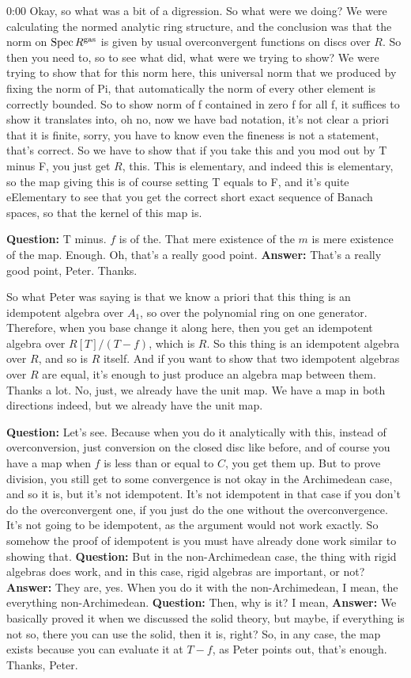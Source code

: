 \begin{unfinished}{0:00}
Okay, so what was a bit of a digression. So what were we doing? We were calculating the normed analytic ring structure, and the conclusion was that the norm on $\operatorname{Spec} R^{\mathrm{gas}}$ is given by usual overconvergent functions on discs over $R$. So then you need to, so to see what did, what were we trying to show? We were trying to show that for this norm here, this universal norm that we produced by fixing the norm of Pi, that automatically the norm of every other element is correctly bounded. So to show norm of f contained in zero f for all f, it suffices to show it translates into, 
oh no, now we have bad notation, it's not clear a priori that it is finite, sorry, you have to know even the fineness is not a statement, that's correct. So we have to show that if you take this and you mod out by T minus F, you just get $R$, this. This is elementary, and indeed this is elementary, so the map giving this is of course setting T equals to F, and it's quite eElementary to see that you get the correct short exact sequence of Banach spaces, so that the kernel of this map is.

\textbf{Question:} T minus. $f$ is of the. That mere existence of the $m$ is mere existence of the map. Enough. Oh, that's a really good point. 
\textbf{Answer:}  That's a really good point, Peter. Thanks.

So what Peter was saying is that we know a priori that this thing is an idempotent algebra over $A_1$, so over the polynomial ring on one generator. Therefore, when you base change it along here, then you get an idempotent algebra over $R[T]/(T-f)$, which is $R$. So this thing is an idempotent algebra over $R$, and so is $R$ itself.
And if you want to show that two idempotent algebras over $R$ are equal, it's enough to just produce an algebra map between them. Thanks a lot. No, just, we already have the unit map. We have a map in both directions indeed, but we already have the unit map.

\textbf{Question:} Let's see. Because when you do it analytically with this, instead of overconversion, just conversion on the closed disc like before, and of course you have a map when $f$ is less than or equal to $C$, you get them up. But to prove division, you still get to some convergence is not okay in the Archimedean case, and so it is, but it's not idempotent. It's not idempotent in that case if you don't do the overconvergent one, if you just do the one without the overconvergence. It's not going to be idempotent, as the argument would not work exactly. So somehow the proof of idempotent is you must have already done work similar to showing that.
\textbf{Question:} But in the non-Archimedean case, the thing with rigid algebras does work, and in this case, rigid algebras are important, or not?
\textbf{Answer:} They are, yes. When you do it with the non-Archimedean, I mean, the everything non-Archimedean.
\textbf{Question:} Then, why is it? I mean, 
\textbf{Answer:} We basically proved it when we discussed the solid theory, but maybe, if everything is not so, there you can use the solid, then it is, right? So, in any case, the map exists because you can evaluate it at $T - f$, as Peter points out, that's enough. Thanks, Peter.


\end{unfinished}
